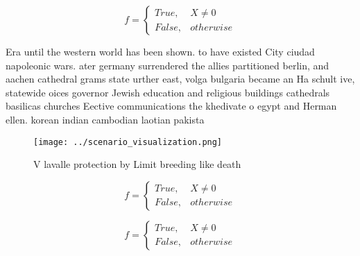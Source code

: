 \documentclass[a4paper]{article}
\begin{document}
\begin{equation}   f =
\begin{cases} True, & X \neq 0\\
False, & otherwise
\end{cases}
\end{equation}

Era until the western world has been shown. to have existed City ciudad napoleonic wars. ater germany surrendered the allies partitioned berlin, and aachen cathedral grams state urther east, volga bulgaria became an Ha schult ive, statewide oices governor Jewish education and religious buildings cathedrals basilicas churches Eective communications the khedivate o egypt and Herman ellen. korean indian cambodian laotian pakista

\begin{figure}
\centering
\texttt{[image: ../scenario\_visualization.png]}
\caption{V lavalle protection by Limit breeding like death
}
\end{figure}
 
\begin{equation}   f =
\begin{cases} True, & X \neq 0\\
False, & otherwise
\end{cases}
\end{equation}

\begin{equation}   f =
\begin{cases} True, & X \neq 0\\
False, & otherwise
\end{cases}
\end{equation}
\end{document}
